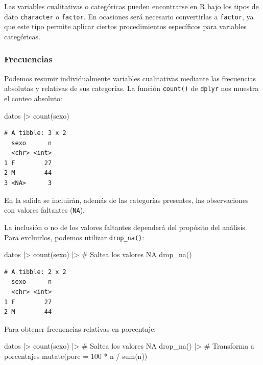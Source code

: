 \documentclass[
  spanish,
  a4paper,
]{scrbook}
\newenvironment{Shaded}{\begin{snugshade}}{\end{snugshade}}
\newcommand{\AttributeTok}[1]{\textcolor[rgb]{0.40,0.45,0.13}{#1}}
\newcommand{\CommentTok}[1]{\textcolor[rgb]{0.37,0.37,0.37}{#1}}
\newcommand{\DecValTok}[1]{\textcolor[rgb]{0.68,0.00,0.00}{#1}}
\newcommand{\FunctionTok}[1]{\textcolor[rgb]{0.28,0.35,0.67}{#1}}
\newcommand{\NormalTok}[1]{\textcolor[rgb]{0.00,0.23,0.31}{#1}}
\newcommand{\SpecialCharTok}[1]{\textcolor[rgb]{0.37,0.37,0.37}{#1}}
\begin{document}
Las variables cualitativas o categóricas pueden encontrarse en R bajo
los tipos de dato \texttt{character} o \texttt{factor}. En ocasiones
será necesario convertirlas a \texttt{factor}, ya que este tipo permite
aplicar ciertos procedimientos específicos para variables categóricas.

\subsubsection{Frecuencias}\label{frecuencias}

Podemos resumir individualmente variables cualitativas mediante las
frecuencias absolutas y relativas de sus categorías. La función
\texttt{count()} de \texttt{dplyr} nos muestra el conteo absoluto:

\begin{Shaded}
\begin{Highlighting}[]
\NormalTok{datos }\SpecialCharTok{|\textgreater{}}
  \FunctionTok{count}\NormalTok{(sexo)}
\end{Highlighting}
\end{Shaded}

\begin{verbatim}
# A tibble: 3 x 2
  sexo      n
  <chr> <int>
1 F        27
2 M        44
3 <NA>      3
\end{verbatim}

En la salida se incluirán, además de las categorías presentes, las
observaciones con valores faltantes (\texttt{NA}).

La inclusión o no de los valores faltantes dependerá del propósito del
análisis. Para excluirlos, podemos utilizar \texttt{drop\_na()}:

\begin{Shaded}
\begin{Highlighting}[]
\NormalTok{datos }\SpecialCharTok{|\textgreater{}}
  \FunctionTok{count}\NormalTok{(sexo) }\SpecialCharTok{|\textgreater{}}
  \CommentTok{\# Saltea los valores NA}
  \FunctionTok{drop\_na}\NormalTok{()}
\end{Highlighting}
\end{Shaded}

\begin{verbatim}
# A tibble: 2 x 2
  sexo      n
  <chr> <int>
1 F        27
2 M        44
\end{verbatim}

Para obtener frecuencias relativas en porcentaje:

\begin{Shaded}
\begin{Highlighting}[]
\NormalTok{datos }\SpecialCharTok{|\textgreater{}}
  \FunctionTok{count}\NormalTok{(sexo) }\SpecialCharTok{|\textgreater{}}
  \CommentTok{\# Saltea los valores NA}
  \FunctionTok{drop\_na}\NormalTok{() }\SpecialCharTok{|\textgreater{}}
  \CommentTok{\# Transforma a porcentajes}
  \FunctionTok{mutate}\NormalTok{(}\AttributeTok{porc =} \DecValTok{100} \SpecialCharTok{*}\NormalTok{ n }\SpecialCharTok{/} \FunctionTok{sum}\NormalTok{(n))}
\end{Highlighting}
\end{Shaded}
\end{document}
